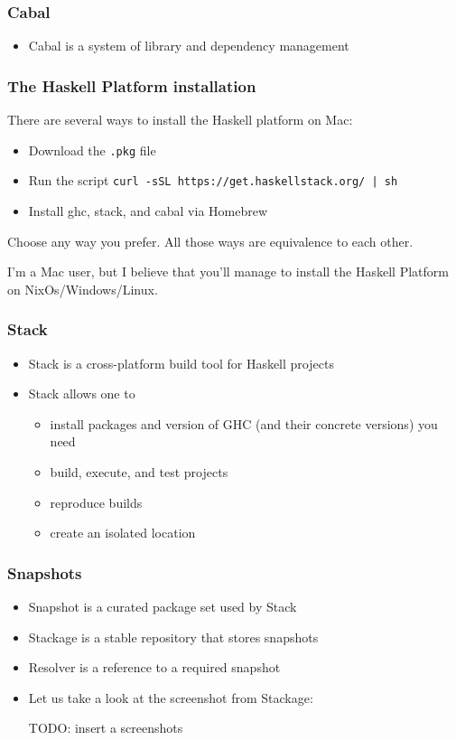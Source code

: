 \documentclass[10pt,pdf,utf8,russian,aspectratio=169]{beamer}
\begin{document}
\begin{frame}
  \frametitle{Cabal}

  \begin{itemize}
    \item Cabal is a system of library and dependency management
  \end{itemize}
\end{frame}

\begin{frame}
  \frametitle{The Haskell Platform installation}

  There are several ways to install the Haskell platform on Mac:

  \begin{itemize}
    \item Download the \verb".pkg" file
    \item Run the script \verb"curl -sSL https://get.haskellstack.org/ | sh"
    \item Install ghc, stack, and cabal via Homebrew
  \end{itemize}

  Choose any way you prefer. All those ways are equivalence to each other.

  \vspace{\baselineskip}

 I'm a Mac user, but I believe that you'll manage to install the Haskell Platform on NixOs/Windows/Linux.
\end{frame}

\begin{frame}
  \frametitle{Stack}

  \begin{itemize}
    \item Stack is a cross-platform build tool for Haskell projects
    \item Stack allows one to
    \begin{itemize}
      \item install packages and version of GHC (and their concrete versions) you need
      \item build, execute, and test projects
      \item reproduce builds
      \item create an isolated location
    \end{itemize}
  \end{itemize}
\end{frame}

\begin{frame}
  \frametitle{Snapshots}

  \begin{itemize}
    \item Snapshot is a curated package set used by Stack
    \item Stackage is a stable repository that stores snapshots
    \item Resolver is a reference to a required snapshot
    \item Let us take a look at the screenshot from Stackage:

    TODO: insert a screenshots
  \end{itemize}
\end{frame}
\end{document}
